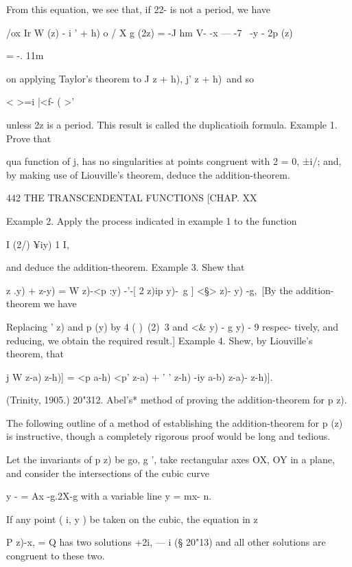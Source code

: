 {From this equation, we see that, if 22- is not a period, we have 

/ox Ir W (z) - i '    + h)  o / X 
g (2z) = -J hm V- -x —  -7 ~-y - 2p (z) 



= -. 11m 



on applying Taylor's theorem to  J  z + h),  j'  z + h)\ and so 



 < >=i |<f- ( >' 



unless 2z is a period. This result is called the duplicatioih formula. 
Example 1. Prove that 

qua function of j, has no singularities at points congruent with 2 = 0, ±i/; and, by making 
use of Liouville's theorem, deduce the addition-theorem. 



442 THE TRANSCENDENTAL FUNCTIONS [CHAP. XX 

Example 2. Apply the process indicated in example 1 to the function 

I  (2/) ¥iy) 1 I, 

and deduce the addition-theorem. 
Example 3. Shew that 

  z .y) +   z-y) = W z)-<p :y) -'-[ 2  z)ip y)-\ g ] <§> z)-  y) -g,\ 
[By the addition-theorem we have 

Replacing  '  z) and p (y) by 4  ( )\    (2)\  3 and  <\& y) - g   y) - 9  respec- 
tively, and reducing, we obtain the required result.] 
Example 4. Shew, by Liouville's theorem, that 

j W z-a)  z-h)] = <p a-h) <p' z-a) + ' ' z-h) -iy a-b)   z-a)-  z-h)]. 

(Trinity, 1905.) 
20"312. Abel's* method of proving the addition-theorem for p  z). 

The following outline of a method of establishing the addition-theorem for p (z) is 
instructive, though a completely rigorous proof would be long and tedious. 

Let the invariants of p z) be go, g ', take rectangular axes OX, OY in a plane, and 
consider the intersections of the cubic curve 

y - = Ax -g.2X-g  
with a variable line y = mx- n. 

If any point ( i, y ) be taken on the cubic, the equation in z 

P z)-x, = Q 
has two solutions +2i, —  i (§ 20"13) and all other solutions are congruent to these two. 

}
